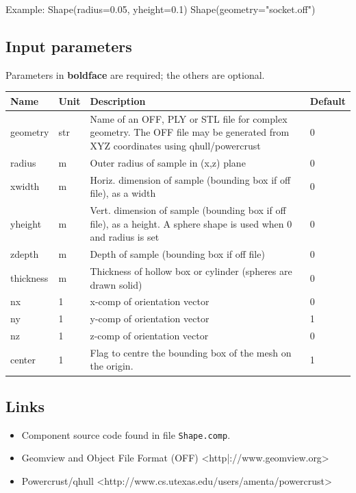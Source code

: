 Example: Shape(radius=0.05, yheight=0.1) Shape(geometry="socket.off")

\subsection*{Input parameters}
Parameters in \textbf{boldface} are required; the others are optional.

\begin{longtable}{p{}p{}p{}p{}}
\toprule
\textbf{Name} & \textbf{Unit} & \textbf{Description} & \textbf{Default} \\
\midrule
\endhead
geometry & str & Name of an OFF, PLY or STL file for complex geometry. The OFF file may be generated from XYZ coordinates using qhull/powercrust & 0 \\
radius & m & Outer radius of sample in (x,z) plane & 0 \\
xwidth & m & Horiz. dimension of sample (bounding box if off file), as a width & 0 \\
yheight & m & Vert.  dimension of sample (bounding box if off file), as a height. A sphere shape is used when 0 and radius is set & 0 \\
zdepth & m & Depth of sample (bounding box if off file) & 0 \\
thickness & m & Thickness of hollow box or cylinder (spheres are drawn solid) & 0 \\
nx & 1 & x-comp of orientation vector & 0 \\
ny & 1 & y-comp of orientation vector & 1 \\
nz & 1 & z-comp of orientation vector & 0 \\
center & 1 & Flag to centre the bounding box of the mesh on the origin. & 1 \\
\bottomrule
\end{longtable}

\subsection*{Links}
\begin{itemize}
  \item Component source code found in file \texttt{Shape.comp}.
  \item Geomview and Object File Format (OFF) \textless{}http|://www.geomview.org\textgreater{}
  \item Powercrust/qhull \textless{}http://www.cs.utexas.edu/users/amenta/powercrust\textgreater{}
\end{itemize}
